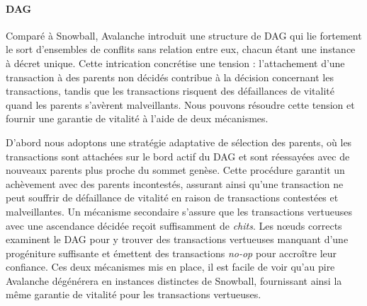 \documentclass[letterpaper,twocolumn,10pt]{article}
\theoremstyle{definition}
\begin{document}
\paragraph{DAG} Comparé à Snowball, Avalanche introduit une structure de DAG qui lie fortement le sort d'ensembles de conflits sans relation entre eux, chacun étant une instance à décret unique.
Cette intrication concrétise une tension : l'attachement d'une transaction à des parents non décidés contribue à la décision concernant les transactions, tandis que les transactions risquent des défaillances de vitalité quand les parents s'avèrent malveillants.
Nous pouvons résoudre cette tension et fournir une garantie de vitalité à l'aide de deux mécanismes.

D'abord nous adoptons une stratégie adaptative de sélection des parents, où les transactions sont attachées sur le bord actif du DAG et sont réessayées avec de nouveaux parents plus proche du sommet genèse. Cette procédure garantit un achèvement avec des parents incontestés, assurant ainsi qu'une transaction ne peut souffrir de défaillance de vitalité en raison de transactions contestées et malveillantes.
Un mécanisme secondaire s'assure que les transactions vertueuses avec une ascendance décidée reçoit suffisamment de \emph{chits}. Les nœuds corrects examinent le DAG pour y trouver des transactions vertueuses manquant d'une progéniture suffisante et émettent des transactions \emph{no-op} pour accroître leur confiance.
Ces deux mécanismes mis en place, il est facile de voir qu'au pire Avalanche dégénérera en instances distinctes de Snowball, fournissant ainsi la même garantie de vitalité pour les transactions vertueuses.
\end{document}
